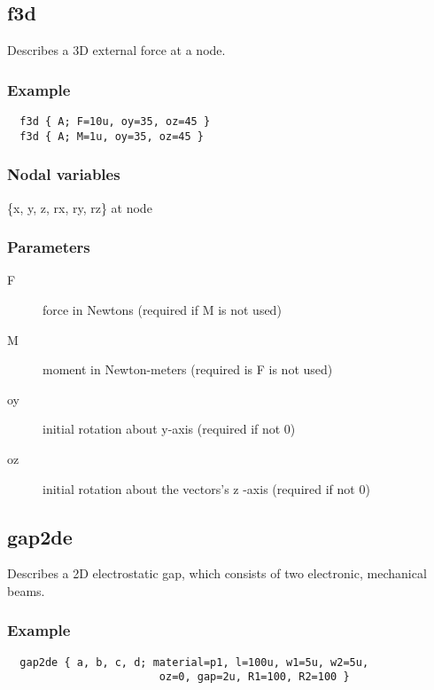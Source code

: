 \subsection{f3d}
 
Describes a 3D external force at a node. 

\subsubsection*{Example}

\begin{verbatim}
  f3d { A; F=10u, oy=35, oz=45 }
  f3d { A; M=1u, oy=35, oz=45 }
\end{verbatim}

 
\subsubsection*{Nodal variables}

\{x, y, z, rx, ry, rz\} at node 
 
\subsubsection*{Parameters}
\begin{description}
 \item[F] force in Newtons (required if M is not used) 
 \item[M] moment in Newton-meters (required is F is not used) 
 \item[oy] initial rotation about y-axis (required if not 0) 
 \item[oz] initial rotation about the vectors's z -axis (required if not 0) 
\end{description}
 
\subsection{gap2de}

Describes a 2D electrostatic gap, which consists of two electronic, mechanical
beams. 

\subsubsection*{Example}

\begin{verbatim}
  gap2de { a, b, c, d; material=p1, l=100u, w1=5u, w2=5u, 
                        oz=0, gap=2u, R1=100, R2=100 }
\end{verbatim}

